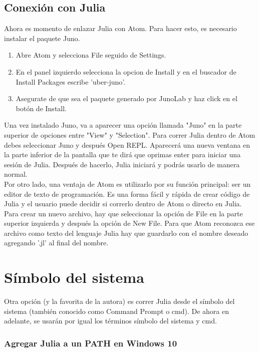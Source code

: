 \subsection{Conexión con Julia}
Ahora es momento de enlazar Julia con Atom. Para hacer esto, es necesario instalar el paquete Juno. 

\begin{enumerate}
    \item Abre Atom y selecciona File seguido de Settings. 
    \item En el panel izquierdo selecciona la opcion de Install y en el buscador de Install Packages escribe 'uber-juno'.
    \item Asegurate de que sea el paquete generado por JunoLab y haz click en el botón de Install. 
\end{enumerate}

Una vez instalado Juno, va a aparecer una opción llamada "Juno" en la parte superior de opciones entre "View" y "Selection". Para correr Julia dentro de Atom debes seleccionar Juno y después Open REPL. Aparecerá una nueva ventana en la parte inferior de la pantalla que te dirá que oprimas enter para iniciar una sesión de Julia. Después de hacerlo, Julia iniciará y podrás usarlo de manera normal. 
\\
Por otro lado, una ventaja de Atom es utilizarlo por su función principal: ser un editor de texto de programación. Es una forma fácil y rápida de crear código de Julia y el usuario puede decidir si correrlo dentro de Atom o directo en Julia. Para crear un nuevo archivo, hay que seleccionar la opción de File en la parte superior izquierda y después la opción de New File. Para que Atom reconozca ese archivo como texto del lenguaje Julia hay que guardarlo con el nombre deseado agregando '.jl' al final del nombre. 



\section{Símbolo del sistema}
Otra opción (y la favorita de la autora) es correr Julia desde el símbolo del sistema (también conocido como Command Prompt o cmd).  De ahora en adelante, se usarán por igual los términos símbolo del sistema y cmd.

\subsubsection{Agregar Julia a un PATH en Windows 10}


